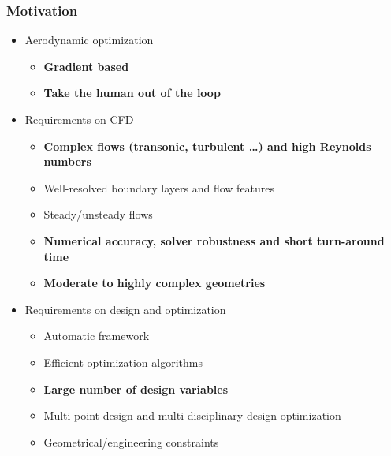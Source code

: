 






\begin{frame}
  \frametitle{Motivation}
  \begin{itemize}
    \item Aerodynamic optimization
     \begin{itemize}
       \item \textbf<2>{Gradient based}
       \item \textbf<2>{Take the human out of the loop}
     \end{itemize}
    \item Requirements on CFD
      \begin{itemize}
      \item \textbf<3>{Complex flows (transonic, turbulent \dots) and high Reynolds numbers}
      \item Well-resolved boundary layers and flow features
      \item Steady/unsteady flows
      \item \textbf<4>{Numerical accuracy, solver robustness and short turn-around time}
      \item \textbf<3>{Moderate to highly complex geometries}
      \end{itemize}
    \item Requirements on design and optimization 
      \begin{itemize}
      \item Automatic framework
      \item Efficient optimization algorithms
      \item \textbf<3>{Large number of design variables}
      \item Multi-point design and multi-disciplinary design optimization
      \item Geometrical/engineering constraints 
      \end{itemize}
   \end{itemize}
   \\
\end{frame}



